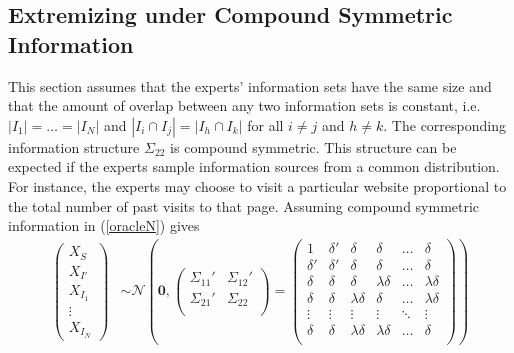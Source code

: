 \documentclass[11pt]{article}
\theoremstyle{definition}
\theoremstyle{definition}
\begin{document}


\subsection{Extremizing under Compound Symmetric Information}
\label{compound}

This section assumes that the experts' information sets have the same size and that the amount of overlap between any two information sets is constant, i.e.  $|I_{1}| =  \dots = |I_{N}|$ and $|I_{i} \cap I_{j}| = |I_{h} \cap I_{k}|$ for all $i \neq j$ and $h \neq k$. 
The corresponding information structure $\Sigma_{22}$ is compound symmetric. This structure can be expected if the experts sample information sources from a common distribution. For instance, the experts may choose to visit a particular website proportional to the total number of past visits to that page. Assuming compound symmetric information in (\ref{oracleN}) gives
\begin{align*}
\left(\begin{matrix} X_{S} \\ X_{I'}\\ X_{I_1}\\ \vdots \\ X_{I_N} \end{matrix}\right) &\sim \mathcal{N}\left( 
 \boldsymbol{0}, \left(\begin{matrix} 
\Sigma_{11}' & \Sigma_{12}'\\
\Sigma_{21}' & \Sigma_{22}\\
 \end{matrix}\right) 
 =
 \left(\begin{array}{cc|cccc}
1 & \delta'& \delta & \delta & \dots & \delta  \\ 
\delta' & \delta' & \delta & \delta & \dots & \delta  \\ \hline
\delta & \delta &\delta & \lambda\delta & \dots & \lambda\delta   \\ 
\delta& \delta & \lambda\delta & \delta & \dots & \lambda\delta  \\ 
\vdots &\vdots & \vdots & \vdots & \ddots & \vdots  \\ 
\delta &\delta & \lambda\delta & \lambda\delta & \dots & \delta\\ 
 \end{array}\right)\right)
\end{align*}
\end{document}
